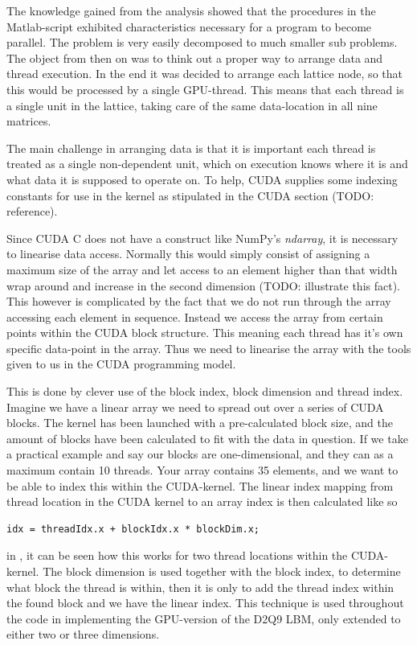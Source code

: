 The knowledge gained from the analysis showed that the procedures in the Matlab-script exhibited characteristics necessary for a program to become parallel. The problem is very easily decomposed to much smaller sub problems. The object from then on was to think out a proper way to arrange data and thread execution. In the end it was decided to arrange each lattice node, so that this would be processed by a single GPU-thread. This means that each thread is a single unit in the lattice, taking care of the same data-location in all nine matrices.

The main challenge in arranging data is that it is important each thread is treated as a single non-dependent unit, which on execution knows where it is and what data it is supposed to operate on. To help, CUDA supplies some indexing constants for use in the kernel as stipulated in the CUDA section (TODO: reference).

Since CUDA C does not have a construct like NumPy's \textit{ndarray}, it is necessary to linearise data access. Normally this would simply consist of assigning a maximum size of the array and let access to an element higher than that width wrap around and increase in the second dimension (TODO: illustrate this fact). This however is complicated by the fact that we do not run through the array accessing each element in sequence. Instead we access the array from certain points within the CUDA block structure. This meaning each thread has it's own specific data-point in the array. Thus we need to linearise the array with the tools given to us in the CUDA programming model.

This is done by clever use of the block index, block dimension and thread index. Imagine we have a linear array we need to spread out over a series of CUDA blocks. The kernel has been launched with a pre-calculated block size, and the amount of blocks have been calculated to fit with the data in question. If we take a practical example and say our blocks are one-dimensional, and they can as a maximum contain 10 threads. Your array contains 35 elements, and we want to be able to index this within the CUDA-kernel. The linear index mapping from thread location in the CUDA kernel to an array index is then calculated like so

\begin{verbatim}
idx = threadIdx.x + blockIdx.x * blockDim.x;
\end{verbatim}

in , it can be seen how this works for two thread locations within the CUDA-kernel. The block dimension is used together with the block index, to determine what block the thread is within, then it is only to add the thread index within the found block and we have the linear index. This technique is used throughout the code in implementing the GPU-version of the D2Q9 LBM, only extended to either two or three dimensions.

